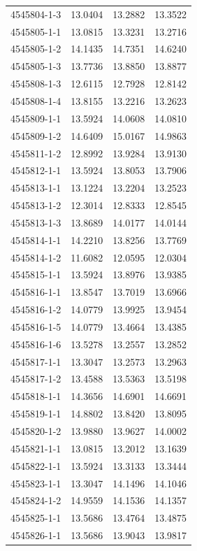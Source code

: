 \begin{longtable}{lrrr}
4545804-1-3 & 13.0404 & 13.2882 & 13.3522 \\
4545805-1-1 & 13.0815 & 13.3231 & 13.2716 \\
4545805-1-2 & 14.1435 & 14.7351 & 14.6240 \\
4545805-1-3 & 13.7736 & 13.8850 & 13.8877 \\
4545808-1-3 & 12.6115 & 12.7928 & 12.8142 \\
4545808-1-4 & 13.8155 & 13.2216 & 13.2623 \\
4545809-1-1 & 13.5924 & 14.0608 & 14.0810 \\
4545809-1-2 & 14.6409 & 15.0167 & 14.9863 \\
4545811-1-2 & 12.8992 & 13.9284 & 13.9130 \\
4545812-1-1 & 13.5924 & 13.8053 & 13.7906 \\
4545813-1-1 & 13.1224 & 13.2204 & 13.2523 \\
4545813-1-2 & 12.3014 & 12.8333 & 12.8545 \\
4545813-1-3 & 13.8689 & 14.0177 & 14.0144 \\
4545814-1-1 & 14.2210 & 13.8256 & 13.7769 \\
4545814-1-2 & 11.6082 & 12.0595 & 12.0304 \\
4545815-1-1 & 13.5924 & 13.8976 & 13.9385 \\
4545816-1-1 & 13.8547 & 13.7019 & 13.6966 \\
4545816-1-2 & 14.0779 & 13.9925 & 13.9454 \\
4545816-1-5 & 14.0779 & 13.4664 & 13.4385 \\
4545816-1-6 & 13.5278 & 13.2557 & 13.2852 \\
4545817-1-1 & 13.3047 & 13.2573 & 13.2963 \\
4545817-1-2 & 13.4588 & 13.5363 & 13.5198 \\
4545818-1-1 & 14.3656 & 14.6901 & 14.6691 \\
4545819-1-1 & 14.8802 & 13.8420 & 13.8095 \\
4545820-1-2 & 13.9880 & 13.9627 & 14.0002 \\
4545821-1-1 & 13.0815 & 13.2012 & 13.1639 \\
4545822-1-1 & 13.5924 & 13.3133 & 13.3444 \\
4545823-1-1 & 13.3047 & 14.1496 & 14.1046 \\
4545824-1-2 & 14.9559 & 14.1536 & 14.1357 \\
4545825-1-1 & 13.5686 & 13.4764 & 13.4875 \\
4545826-1-1 & 13.5686 & 13.9043 & 13.9817 \\

\end{longtable}
